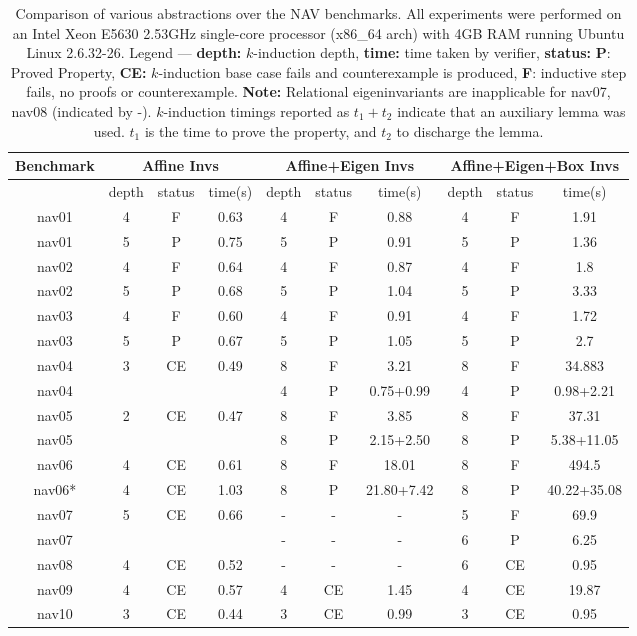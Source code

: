 \documentclass{article}
\begin{document}
\begin{table}[t]
{\footnotesize \begin{center}
\begin{tabular}{|c||c|c|c||c|c|c||c|c|c|}
\hline
Benchmark & 
\multicolumn{3}{c||}{Affine Invs} & 
\multicolumn{3}{c||}{Affine+Eigen Invs} & 
\multicolumn{3}{c|}{Affine+Eigen+Box Invs}
\\ \hline
 & depth & status & time(s)
 & depth & status & time(s)
 & depth & status & time(s)
\\ \hline\hline
nav01  
& 4 & F & 0.63
& 4 & F & 0.88
& 4 & F & 1.91
\\ 
nav01  
& 5 & P & 0.75
& 5 & P & 0.91
& 5 & P & 1.36
\\ \hline
nav02
& 4 & F & 0.64
& 4 & F & 0.87
& 4 & F & 1.8
\\ 
nav02
& 5 & P & 0.68
& 5 & P & 1.04
& 5 & P & 3.33
\\ \hline
nav03
& 4 & F & 0.60
& 4 & F & 0.91
& 4 & F & 1.72
\\ 
nav03
& 5 & P & 0.67
& 5 & P & 1.05
& 5 & P & 2.7
\\ \hline
nav04
& 3 & CE & 0.49
& 8 & F & 3.21
& 8 & F & 34.883
\\ 
nav04
& & &  
& 4 & P & 0.75+0.99
& 4 & P & 0.98+2.21
\\ \hline
nav05
& 2 & CE & 0.47
& 8 & F & 3.85
& 8 & F & 37.31
\\ 
nav05
& & &
& 8 & P & 2.15+2.50
& 8 & P & 5.38+11.05
\\ \hline
nav06
& 4 & CE & 0.61
& 8 & F & 18.01
& 8 & F & 494.5
\\ 
nav06*
& 4 & CE & 1.03
& 8 & P & 21.80+7.42  
& 8 & P & 40.22+35.08  
\\ \hline
nav07
& 5 & CE & 0.66
& - & - & - 
& 5 & F & 69.9 
\\ 
nav07
& & &
& - & - &- 
& 6 & P & 6.25 
\\ \hline
nav08
& 4 & CE & 0.52
& - & - &- 
& 6 & CE & 0.95
\\ \hline
nav09
& 4 & CE & 0.57
& 4 & CE & 1.45
& 4 & CE & 19.87
\\ \hline
nav10
& 3 & CE & 0.44
& 3 & CE & 0.99
& 3 & CE & 0.95
\\ \hline
\end{tabular}
\end{center}
}
\caption{Comparison of various abstractions over the NAV
  benchmarks. All experiments were performed on an Intel Xeon E5630 2.53GHz
  single-core processor (x86\_64 arch) with 4GB RAM running Ubuntu
  Linux 2.6.32-26.  Legend --- \textbf{depth:}
  $k$-induction depth, \textbf{time:} time taken by verifier,
  \textbf{status:}  \textbf{P}: Proved
  Property, \textbf{CE:} $k$-induction base case fails and
  counterexample is produced, \textbf{F}: inductive step fails, no
  proofs or counterexample.  \textbf{Note:} Relational
  eigeninvariants are inapplicable for nav07, nav08 (indicated by -).  
$k$-induction timings  reported as $t_1+t_2$ indicate that an auxiliary lemma was used. $t_1$ is the time to prove the
  property, and $t_2$  to discharge the
 lemma.
}\label{table-exp}
\end{table}
\end{document}
